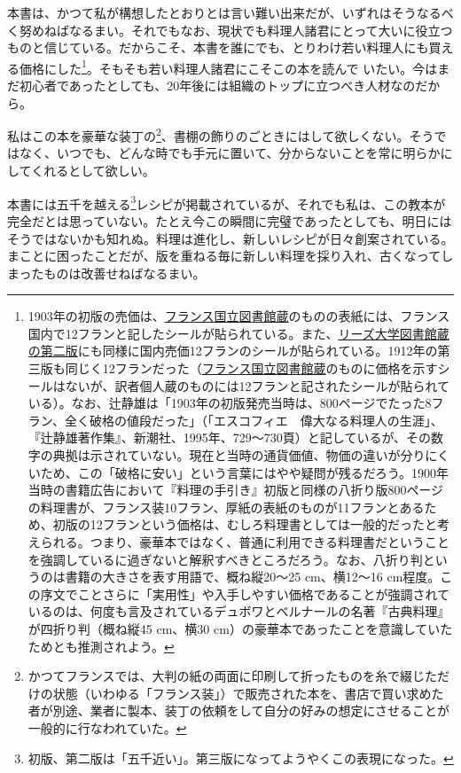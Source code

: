 本書は、かつて私が構想したとおりとは言い難い出来だが、いずれはそうなるべく努めねばなるまい。それでもなお、現状でも料理人諸君にとって大いに役立つものと信じている。だからこそ、本書を誰にでも、とりわけ若い料理人にも買える価格にした\footnote{1903年の初版の売価は、\href{http://gallica.bnf.fr/ark:/12148/bpt6k65768837}{フランス国立図書館蔵}のものの表紙には、フランス国内で12フランと記したシールが貼られている。また、\href{https://archive.org/details/b21525912}{リーズ大学図書館蔵の第二版}にも同様に国内売価12フランのシールが貼られている。1912年の第三版も同じく12フランだった（\href{http://gallica.bnf.fr/ark:/12148/bpt6k96923116}{フランス国立図書館蔵}のものに価格を示すシールはないが、訳者個人蔵のものには12フランと記されたシールが貼られている）。なお、辻静雄は「1903年の初版発売当時は、800ページでたった8フラン、全く破格の値段だった」（「エスコフィエ　偉大なる料理人の生涯」、『辻静雄著作集』、新潮社、1995年、729〜730頁）と記しているが、その数字の典拠は示されていない。現在と当時の通貨価値、物価の違いが分りにくいため、この「破格に安い」という言葉にはやや疑問が残るだろう。1900年当時の書籍広告において『料理の手引き』初版と同様の八折り版800ページの料理書が、フランス装10フラン、厚紙の表紙のものが11フランとあるため、初版の12フランという価格は、むしろ料理書としては一般的だったと考えられる。つまり、豪華本ではなく、普通に利用できる料理書だということを強調しているに過ぎないと解釈すべきところだろう。なお、八折り判というのは書籍の大きさを表す用語で、概ね縦20〜25
  cm、横12〜16
  cm程度。この序文でことさらに「実用性」や入手しやすい価格であることが強調されているのは、何度も言及されているデュボワとベルナールの名著『古典料理』が四折り判（概ね縦45
  cm、横30 cm）の豪華本であったことを意識していたためとも推測されよう。}。そもそも若い料理人諸君にこそこの本を読んで
いたい。今はまだ初心者であったとしても、20年後には組織のトップに立つべき人材なのだから。

私はこの本を豪華な装丁の\footnote{かつてフランスでは、大判の紙の両面に印刷して折ったものを糸で綴じただけの状態（いわゆる「フランス装」）で販売された本を、書店で買い求めた者が別途、業者に製本、装丁の依頼をして自分の好みの想定にさせることが一般的に行なわれていた。}、書棚の飾りのごときにはして欲しくない。そうではなく、いつでも、どんな時でも手元に置いて、分からないことを常に明らかにしてくれるとして欲しい。

本書には五千を越える\footnote{初版、第二版は「五千近い」。第三版になってようやくこの表現になった。}レシピが掲載されているが、それでも私は、この教本が完全だとは思っていない。たとえ今この瞬間に完璧であったとしても、明日にはそうではないかも知れぬ。料理は進化し、新しいレシピが日々創案されている。まことに困ったことだが、版を重ねる毎に新しい料理を採り入れ、古くなってしまったものは改善せねばなるまい。

